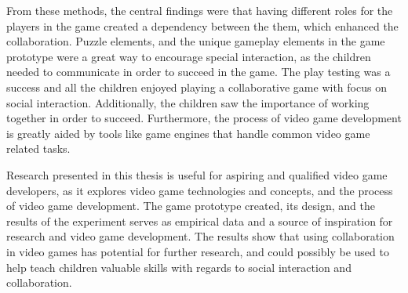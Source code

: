 From these methods, the central findings were that having different roles for the players in the game created a dependency between the them, which enhanced the collaboration. Puzzle elements, and the unique gameplay elements in the game prototype were a great way to encourage special interaction, as the children needed to communicate in order to succeed in the game. The play testing was a success and all the children enjoyed playing a collaborative game with focus on social interaction. Additionally, the children saw the importance of working together in order to succeed. Furthermore, the process of video game development is greatly aided by tools like game engines that handle common video game related tasks.

Research presented in this thesis is useful for aspiring and qualified video game developers, as it explores video game technologies and concepts, and the process of video game development. The game prototype created, its design, and the results of the experiment serves as empirical data and a source of inspiration for research and video game development. The results show that using collaboration in video games has potential for further research, and could possibly be used to help teach children valuable skills with regards to social interaction and collaboration.



